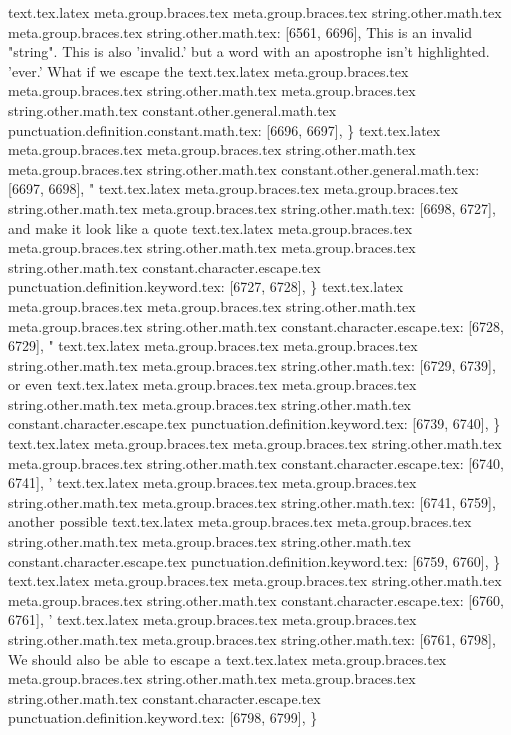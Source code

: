 {{{{{{{{{{{{{{{{{{{{{{{{{{{{{{{{{{{{{{{{{{{{{{{{{{{{{{{{{{{{{{{{{{{{{{{{{{{{{{{{{{{{{{{{{{{{{{{{{{{{{{{{{{{{{{{{{{{{{{{{{{{{{{{{{{{{{{{{{{{{{{{{{{{{{{{{{{{{{{{{{{{{{{{{{{{{{{{{{{{{{{}
text.tex.latex meta.group.braces.tex meta.group.braces.tex string.other.math.tex meta.group.braces.tex string.other.math.tex: [6561, 6696], {This is an invalid "string".  This is also 'invalid.'  but a word with an apostrophe isn't highlighted. 'ever.'  What if we escape the }
text.tex.latex meta.group.braces.tex meta.group.braces.tex string.other.math.tex meta.group.braces.tex string.other.math.tex constant.other.general.math.tex punctuation.definition.constant.math.tex: [6696, 6697], {\}
text.tex.latex meta.group.braces.tex meta.group.braces.tex string.other.math.tex meta.group.braces.tex string.other.math.tex constant.other.general.math.tex: [6697, 6698], {"}
text.tex.latex meta.group.braces.tex meta.group.braces.tex string.other.math.tex meta.group.braces.tex string.other.math.tex: [6698, 6727], {and make it look like a quote}
text.tex.latex meta.group.braces.tex meta.group.braces.tex string.other.math.tex meta.group.braces.tex string.other.math.tex constant.character.escape.tex punctuation.definition.keyword.tex: [6727, 6728], {\}
text.tex.latex meta.group.braces.tex meta.group.braces.tex string.other.math.tex meta.group.braces.tex string.other.math.tex constant.character.escape.tex: [6728, 6729], {"}
text.tex.latex meta.group.braces.tex meta.group.braces.tex string.other.math.tex meta.group.braces.tex string.other.math.tex: [6729, 6739], {  or even }
text.tex.latex meta.group.braces.tex meta.group.braces.tex string.other.math.tex meta.group.braces.tex string.other.math.tex constant.character.escape.tex punctuation.definition.keyword.tex: [6739, 6740], {\}
text.tex.latex meta.group.braces.tex meta.group.braces.tex string.other.math.tex meta.group.braces.tex string.other.math.tex constant.character.escape.tex: [6740, 6741], {'}
text.tex.latex meta.group.braces.tex meta.group.braces.tex string.other.math.tex meta.group.braces.tex string.other.math.tex: [6741, 6759], { another possible }
text.tex.latex meta.group.braces.tex meta.group.braces.tex string.other.math.tex meta.group.braces.tex string.other.math.tex constant.character.escape.tex punctuation.definition.keyword.tex: [6759, 6760], {\}
text.tex.latex meta.group.braces.tex meta.group.braces.tex string.other.math.tex meta.group.braces.tex string.other.math.tex constant.character.escape.tex: [6760, 6761], {'}
text.tex.latex meta.group.braces.tex meta.group.braces.tex string.other.math.tex meta.group.braces.tex string.other.math.tex: [6761, 6798], {  We should also be able to escape a }
text.tex.latex meta.group.braces.tex meta.group.braces.tex string.other.math.tex meta.group.braces.tex string.other.math.tex constant.character.escape.tex punctuation.definition.keyword.tex: [6798, 6799], {\}
}}}}}}}}}}}}}}}}}}}}}}}}}}}}}}}}}}}}}}}}}}}}}}}}}}}}}}}}}}}}}}}}}}}}}}}}}}}}}}}}}}}}}}}}}}}}}}}}}}}}}}}}}}}}}}}}}}}}}}}}}}}}}}}}}}}}}}}}}}}}}}}}}}}}}}}}}}}}}}}}}}}}}}}}}}}}}}}}}}}}}}}}}}

